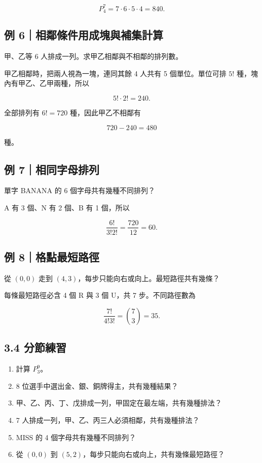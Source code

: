 \documentclass[11pt,a4paper]{article}
\providecommand{\tightlist}{%
  \setlength{\itemsep}{0pt}\setlength{\parskip}{0pt}}
\begin{document}
\[
P^7_4=7\cdot6\cdot5\cdot4=840.
\]

\subsection{例 6｜相鄰條件用成塊與補集計算}\label{ux4f8b-6ux76f8ux9130ux689dux4ef6ux7528ux6210ux584aux8207ux88dcux96c6ux8a08ux7b97}

甲、乙等 6 人排成一列。求甲乙相鄰與不相鄰的排列數。

甲乙相鄰時，把兩人視為一塊，連同其餘 4 人共有 5 個單位。單位可排 \(5!\) 種，塊內有甲乙、乙甲兩種，所以

\[
5!\cdot2!=240.
\]

全部排列有 \(6!=720\) 種，因此甲乙不相鄰有

\[
720-240=480
\]

種。

\subsection{例 7｜相同字母排列}\label{ux4f8b-7ux76f8ux540cux5b57ux6bcdux6392ux5217}

單字 BANANA 的 6 個字母共有幾種不同排列？

A 有 3 個、N 有 2 個、B 有 1 個，所以

\[
\frac{6!}{3!2!}=\frac{720}{12}=60.
\]

\subsection{例 8｜格點最短路徑}\label{ux4f8b-8ux683cux9edeux6700ux77edux8defux5f91}

從 \((0,0)\) 走到 \((4,3)\)，每步只能向右或向上。最短路徑共有幾條？

每條最短路徑必含 4 個 R 與 3 個 U，共 7 步。不同路徑數為

\[
\frac{7!}{4!3!}=\binom{7}{3}=35.
\]

\subsection{3.4 分節練習}\label{ux5206ux7bc0ux7df4ux7fd2-2}

\begin{enumerate}
\def\labelenumi{\arabic{enumi}.}
\tightlist
\item
  計算 \(P^9_3\)。
\item
  8 位選手中選出金、銀、銅牌得主，共有幾種結果？
\item
  甲、乙、丙、丁、戊排成一列，甲固定在最左端，共有幾種排法？
\item
  7 人排成一列，甲、乙、丙三人必須相鄰，共有幾種排法？
\item
  MISS 的 4 個字母共有幾種不同排列？
\item
  從 \((0,0)\) 到 \((5,2)\)，每步只能向右或向上，共有幾條最短路徑？
\end{enumerate}
\end{document}
